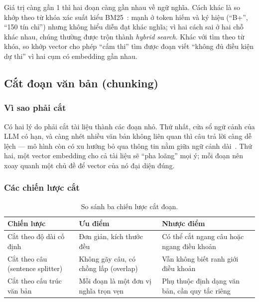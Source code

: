Giá trị càng gần 1 thì hai đoạn càng gần nhau về ngữ nghĩa. Cách khác là so khớp theo từ khóa xác suất kiểu BM25~\cite{robertson2009bm25}: mạnh ở token hiếm và ký hiệu (``B+'', ``150 tín chỉ'') nhưng không hiểu diễn đạt khác nghĩa; vì hai cách sai ở hai chỗ khác nhau, chúng thường được trộn thành \emph{hybrid search}. Khác với tìm theo từ khóa, so khớp vector cho phép ``cấm thi'' tìm được đoạn viết ``không đủ điều kiện dự thi'' vì hai cụm có embedding gần nhau.

\subsection{Cắt đoạn văn bản (chunking)}

\subsubsection{Vì sao phải cắt}

Có hai lý do phải cắt tài liệu thành các đoạn nhỏ. Thứ nhất, cửa sổ ngữ cảnh của LLM có hạn, và càng nhét nhiều văn bản không liên quan thì câu trả lời càng dễ lệch --- mô hình còn có xu hướng bỏ qua thông tin nằm giữa ngữ cảnh dài~\cite{liu2023lostinthemiddle}. Thứ hai, một vector embedding cho cả tài liệu sẽ ``pha loãng'' mọi ý; mỗi đoạn nên xoay quanh một chủ đề để vector của nó đại diện đúng.

\subsubsection{Các chiến lược cắt}

\begin{table}[H]
  \centering
  \small
  \begin{tabularx}{\textwidth}{l X X}
    \toprule
    \textbf{Chiến lược} & \textbf{Ưu điểm} & \textbf{Nhược điểm} \\
    \midrule
    Cắt theo độ dài cố định & Đơn giản, kích thước đều & Có thể cắt ngang câu hoặc ngang điều khoản \\
    Cắt theo câu (sentence splitter) & Không gãy câu, có chồng lấp (overlap) & Vẫn không biết ranh giới điều khoản \\
    Cắt theo cấu trúc văn bản & Mỗi đoạn là một đơn vị nghĩa trọn vẹn & Phụ thuộc định dạng văn bản, cần quy tắc riêng \\
    \bottomrule
  \end{tabularx}
  \caption{So sánh ba chiến lược cắt đoạn.}
\end{table}

